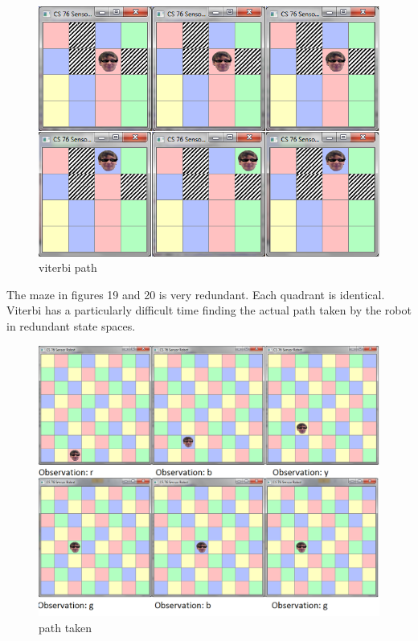 \documentclass[a4paper]{article}
\begin{document}
\begin{figure}[H]
\centering
\includegraphics[width=1\textwidth]{viterbiPathwrong.png}
\caption{\label{fig:2x2 maze}viterbi path}
\end{figure}

The maze in figures 19 and 20 is very redundant. Each quadrant is identical. Viterbi has a particularly difficult time finding the actual path taken by the robot in redundant state spaces.

\begin{figure}[H]
\centering
\includegraphics[width=1.2\textwidth]{10x10RobotAmbiguous.png}
\caption{\label{fig:2x2 maze}path taken}
\end{figure}
\end{document}
